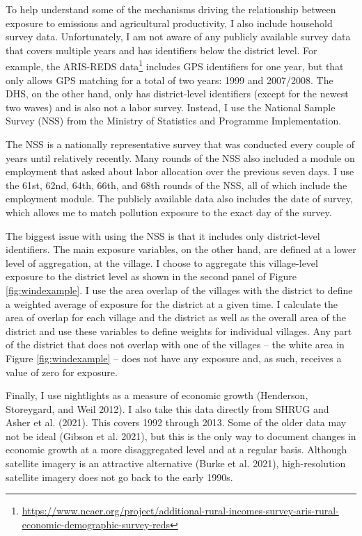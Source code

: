 \documentclass[
]{article}
\begin{document}
To help understand some of the mechanisms driving the relationship between exposure to emissions and agricultural productivity, I also include household survey data. Unfortunately, I am not aware of any publicly available survey data that covers multiple years and has identifiers below the district level. For example, the ARIS-REDS data\footnote{\url{https://www.ncaer.org/project/additional-rural-incomes-survey-aris-rural-economic-demographic-survey-reds}} includes GPS identifiers for one year, but that only allows GPS matching for a total of two years: 1999 and 2007/2008. The DHS, on the other hand, only has district-level identifiers (except for the newest two waves) and is also not a labor survey. Instead, I use the National Sample Survey (NSS) from the Ministry of Statistics and Programme Implementation.

The NSS is a nationally representative survey that was conducted every couple of years until relatively recently. Many rounds of the NSS also included a module on employment that asked about labor allocation over the previous seven days. I use the 61st, 62nd, 64th, 66th, and 68th rounds of the NSS, all of which include the employment module. The publicly available data also includes the date of survey, which allows me to match pollution exposure to the exact day of the survey.

The biggest issue with using the NSS is that it includes only district-level identifiers. The main exposure variables, on the other hand, are defined at a lower level of aggregation, at the village. I choose to aggregate this village-level exposure to the district level as shown in the second panel of Figure \ref{fig:windexample}. I use the area overlap of the villages with the district to define a weighted average of exposure for the district at a given time. I calculate the area of overlap for each village and the district as well as the overall area of the district and use these variables to define weights for individual villages. Any part of the district that does not overlap with one of the villages -- the white area in Figure \ref{fig:windexample} -- does not have any exposure and, as such, receives a value of zero for exposure.

Finally, I use nightlights as a measure of economic growth (Henderson, Storeygard, and Weil 2012). I also take this data directly from SHRUG and Asher et al. (2021). This covers 1992 through 2013. Some of the older data may not be ideal (Gibson et al. 2021), but this is the only way to document changes in economic growth at a more disaggregated level and at a regular basis. Although satellite imagery is an attractive alternative (Burke et al. 2021), high-resolution satellite imagery does not go back to the early 1990s.
\end{document}
